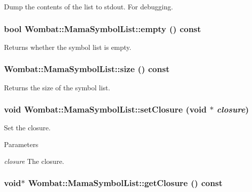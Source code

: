 Dump the contents of the list to stdout. For debugging. \hypertarget{classWombat_1_1MamaSymbolList_a6a23143d98e0d3c00e1b3a782fa798b4}{
\subsubsection[{empty}]{\setlength{\rightskip}{0pt plus 5cm}bool Wombat::MamaSymbolList::empty () const}}
\label{classWombat_1_1MamaSymbolList_a6a23143d98e0d3c00e1b3a782fa798b4}
\begin{DoxyReturn}{Returns}
whether the symbol list is empty. 
\end{DoxyReturn}
\hypertarget{classWombat_1_1MamaSymbolList_a71bfd4ab4ebaf41a18476509c94acd37}{
\subsubsection[{size}]{ Wombat::MamaSymbolList::size () const}}
\label{classWombat_1_1MamaSymbolList_a71bfd4ab4ebaf41a18476509c94acd37}
\begin{DoxyReturn}{Returns}
the size of the symbol list. 
\end{DoxyReturn}
\hypertarget{classWombat_1_1MamaSymbolList_ac0bf254f21ab219fad953aaeb6a1b726}{
\subsubsection[{setClosure}]{\setlength{\rightskip}{0pt plus 5cm}void Wombat::MamaSymbolList::setClosure (void $\ast$ {\em closure})}}
\label{classWombat_1_1MamaSymbolList_ac0bf254f21ab219fad953aaeb6a1b726}


Set the closure. 
\begin{DoxyParams}{Parameters}
\item[{\em closure}]The closure. \end{DoxyParams}
\hypertarget{classWombat_1_1MamaSymbolList_a674ab07f378fb1fa80935f5a9b12cbb6}{
\subsubsection[{getClosure}]{\setlength{\rightskip}{0pt plus 5cm}void$\ast$ Wombat::MamaSymbolList::getClosure () const}}
\label{classWombat_1_1MamaSymbolList_a674ab07f378fb1fa80935f5a9b12cbb6}


